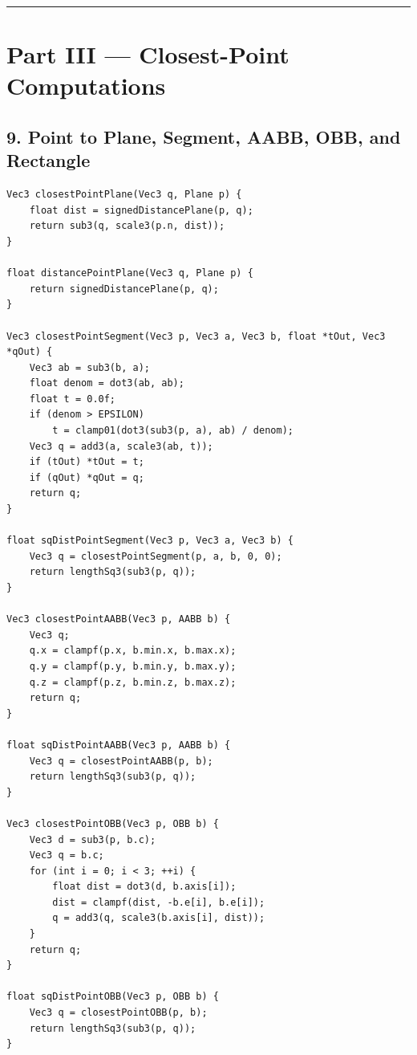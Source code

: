 \documentclass[10pt,letterpaper]{article}
\begin{document}
\medskip\hrule\medskip


\clearpage
{}
\section*{Part III --- Closest-Point Computations}


\subsection*{9. Point to Plane, Segment, AABB, OBB, and Rectangle}

\begin{verbatim}
Vec3 closestPointPlane(Vec3 q, Plane p) {
    float dist = signedDistancePlane(p, q);
    return sub3(q, scale3(p.n, dist));
}

float distancePointPlane(Vec3 q, Plane p) {
    return signedDistancePlane(p, q);
}

Vec3 closestPointSegment(Vec3 p, Vec3 a, Vec3 b, float *tOut, Vec3 *qOut) {
    Vec3 ab = sub3(b, a);
    float denom = dot3(ab, ab);
    float t = 0.0f;
    if (denom > EPSILON)
        t = clamp01(dot3(sub3(p, a), ab) / denom);
    Vec3 q = add3(a, scale3(ab, t));
    if (tOut) *tOut = t;
    if (qOut) *qOut = q;
    return q;
}

float sqDistPointSegment(Vec3 p, Vec3 a, Vec3 b) {
    Vec3 q = closestPointSegment(p, a, b, 0, 0);
    return lengthSq3(sub3(p, q));
}

Vec3 closestPointAABB(Vec3 p, AABB b) {
    Vec3 q;
    q.x = clampf(p.x, b.min.x, b.max.x);
    q.y = clampf(p.y, b.min.y, b.max.y);
    q.z = clampf(p.z, b.min.z, b.max.z);
    return q;
}

float sqDistPointAABB(Vec3 p, AABB b) {
    Vec3 q = closestPointAABB(p, b);
    return lengthSq3(sub3(p, q));
}

Vec3 closestPointOBB(Vec3 p, OBB b) {
    Vec3 d = sub3(p, b.c);
    Vec3 q = b.c;
    for (int i = 0; i < 3; ++i) {
        float dist = dot3(d, b.axis[i]);
        dist = clampf(dist, -b.e[i], b.e[i]);
        q = add3(q, scale3(b.axis[i], dist));
    }
    return q;
}

float sqDistPointOBB(Vec3 p, OBB b) {
    Vec3 q = closestPointOBB(p, b);
    return lengthSq3(sub3(p, q));
}
\end{verbatim}
\end{document}
